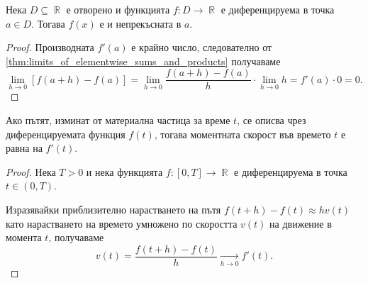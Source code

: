 \documentclass{../../common/topic}
\begin{document}
\begin{proposition}
  Нека \( D \subseteq \BbbR \) е отворено и функцията \( f: D \to \BbbR \) е диференцируема в точка \( a \in D \). Тогава \( f(x) \) е и непрекъсната в \( a \).
\end{proposition}
\begin{proof}
  Производната \( f'(a) \) е крайно число, следователно от \cref{thm:limits_of_elementwise_sums_and_products} получаваме
  \begin{equation*}
    \lim_{h \to 0} [f(a+h) - f(a)]
    =
    \lim_{h \to 0} \frac {f(a+h) - f(a)} h \cdot \lim_{h \to 0} h
    =
    f'(a) \cdot 0
    =
    0.
  \end{equation*}
\end{proof}

\begin{theorem}
  Ако пътят, изминат от материална частица за време \( t \), се описва чрез диференцируемата функция \( f(t) \), тогава моментната скорост във времето \( t \) е равна на \( f'(t) \).
\end{theorem}
\begin{proof}
  Нека \( T > 0 \) и нека функцията \( f: [0, T] \to \BbbR \) е диференцируема в точка \( t \in (0, T) \).

  Изразявайки приблизително нарастването на пътя \( f(t+h) - f(t) \approx h v(t) \) като нарастването на времето умножено по скоростта \( v(t) \) на движение в момента \( t \), получаваме
  \begin{equation*}
    v(t) = \frac{f(t+h) - f(t)} {h} \xrightarrow[h \to 0]{} f'(t).
  \end{equation*}
\end{proof}
\end{document}
